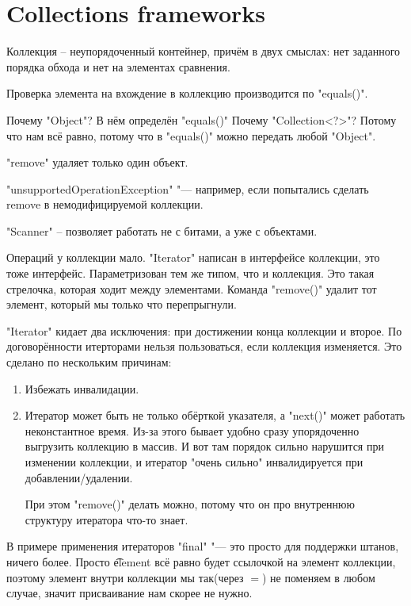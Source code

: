 \chapter{Collections frameworks}
Коллекция -- неупорядоченный контейнер, причём в двух смыслах: 
нет заданного порядка обхода и нет на элементах сравнения.

Проверка элемента на вхождение в коллекцию производится по \java"equals()".

Почему \java"Object"? В нём определён \java"equals()"
Почему \java"Collection<?>"? Потому что нам всё равно, потому что в \java"equals()" можно передать любой \java"Object".

\java"remove" удаляет только один объект.

\java"unsupportedOperationException" "--- например, если попытались сделать remove в немодифицируемой коллекции.

\java"Scanner" -- позволяет работать не с битами, а уже с объектами.

Операций у коллекции мало.
\java"Iterator" написан в интерфейсе коллекции, это тоже интерфейс. Параметризован тем же типом, что и коллекция.
Это такая стрелочка, которая ходит между элементами.
Команда \java"remove()" удалит тот элемент, который мы только что перепрыгнули.

\java"Iterator" кидает два исключения: при достижении конца коллекции и второе.
По договорённости итерторами нельзя пользоваться, если коллекция изменяется.
Это сделано по нескольким причинам:
\begin{enumerate}
	\item
		Избежать инвалидации.
	\item
		Итератор может быть не только обёрткой указателя, а \java"next()" может работать неконстантное время. 
		Из-за этого бывает удобно сразу упорядоченно выгрузить коллекцию в массив.
		И вот там порядок сильно нарушится при изменении коллекции, 
		и итератор "очень сильно" инвалидируется при добавлении/удалении.
		
		При этом \java"remove()" делать можно, потому что он про внутреннюю структуру итератора что-то знает.
		
\end{enumerate}

В примере применения итераторов \java"final" "--- это просто для поддержки штанов, ничего более. 
Просто \t{element} всё равно будет ссылочкой на элемент коллекции,
поэтому элемент внутри коллекции мы так(через $=$) не поменяем в любом случае, значит присваивание нам скорее не нужно.

